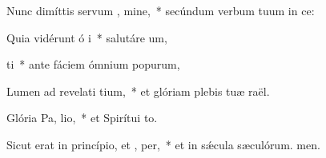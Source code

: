 \item Nunc dimíttis servum , mine,~* secúndum verbum tuum in ce:
\item Quia vidérunt ó i~* salutáre um,
\item {} ti~* ante fáciem ómnium popurum,
\item Lumen ad revelati tium,~* et glóriam plebis tuæ raël.
\item Glória Pa,  lio,~* et Spirítui to.
\item Sicut erat in princípio, et ,  per,~* et in sǽcula sæculórum. men.
